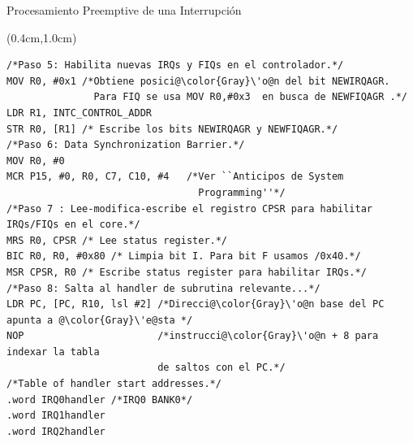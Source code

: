 \documentclass[usenames,table,xcolor={x11names},aspectratio=169]{beamer}
\begin{document}
\begin{frame}[t,fragile]{Procesamiento Preemptive de una Interrupción}
 \begin{textblock*}{\textwidth}(0.4cm,1.0cm)
  \begin{lstlisting}[basicstyle=\scriptsize,escapechar=\@,numbers=none, frame=single, xleftmargin=20pt, xrightmargin=0pt,]
/*Paso 5: Habilita nuevas IRQs y FIQs en el controlador.*/
MOV R0, #0x1 /*Obtiene posici@\color{Gray}\'o@n del bit NEWIRQAGR. 
               Para FIQ se usa MOV R0,#0x3  en busca de NEWFIQAGR .*/
LDR R1, INTC_CONTROL_ADDR
STR R0, [R1] /* Escribe los bits NEWIRQAGR y NEWFIQAGR.*/
/*Paso 6: Data Synchronization Barrier.*/
MOV R0, #0 
MCR P15, #0, R0, C7, C10, #4   /*Ver ``Anticipos de System 
                                 Programming''*/
/*Paso 7 : Lee-modifica-escribe el registro CPSR para habilitar 
IRQs/FIQs en el core.*/
MRS R0, CPSR /* Lee status register.*/
BIC R0, R0, #0x80 /* Limpia bit I. Para bit F usamos /0x40.*/
MSR CPSR, R0 /* Escribe status register para habilitar IRQs.*/
/*Paso 8: Salta al handler de subrutina relevante...*/
LDR PC, [PC, R10, lsl #2] /*Direcci@\color{Gray}\'o@n base del PC apunta a @\color{Gray}\'e@sta */
NOP                       /*instrucci@\color{Gray}\'o@n + 8 para indexar la tabla 
                          de saltos con el PC.*/
/*Table of handler start addresses.*/
.word IRQ0handler /*IRQ0 BANK0*/
.word IRQ1handler
.word IRQ2handler   
  \end{lstlisting}
 \end{textblock*}
\end{frame}
\end{document}
